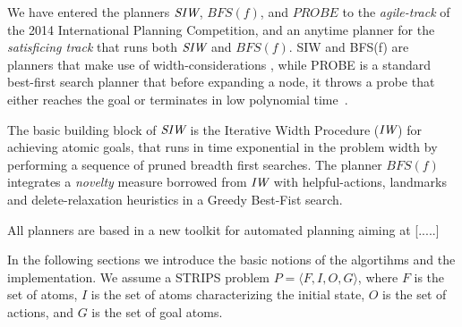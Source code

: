 
We have entered the planners ${\textit{SIW}}$, $BFS(f)$, and $PROBE$ to the
\emph{agile-track} of the 2014 International Planning Competition, and an anytime
planner for the \emph{satisficing track} that runs both ${\textit{SIW}}$ and $BFS(f)$.
SIW and BFS(f) are planners that make use of width-considerations \cite{nir:ecai12}, while PROBE is a standard best-first search planner that before expanding a node, it throws a probe  that
either reaches the goal or terminates in low polynomial time~\cite{nir:icaps11}.

The basic building block of ${\textit{SIW}}$ is the Iterative Width Procedure
(${\textit{IW}}$) for achieving atomic goals, that runs in time exponential in
the problem width by performing a sequence of pruned breadth first
searches.  The planner $BFS(f)$ integrates a \emph{novelty} measure
borrowed from ${\textit{IW}}$ with helpful-actions, landmarks and
delete-relaxation heuristics in a Greedy Best-Fist
search.  

 All planners are based in a new toolkit for automated planning
 \cite{} aiming at [.....]



In the following sections we introduce the basic notions of the
algortihms and the implementation. We assume a STRIPS problem $P =
\langle F,I,O,G\rangle$, where $F$ is the set of atoms, $I$ is the set
of atoms characterizing the initial state, $O$ is the set of actions,
and $G$ is the set of goal atoms.

